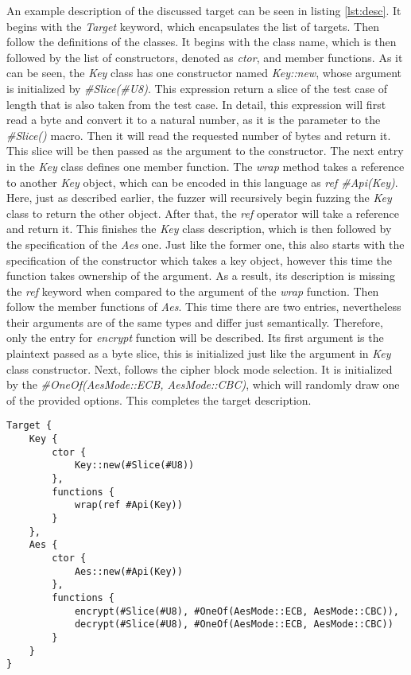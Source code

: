 An example description of the discussed target can be seen in listing \ref{lst:desc}. It begins with the \textit{Target} keyword, which encapsulates the list of targets. Then follow the definitions of the classes. It begins with the class name, which is then followed by the list of constructors, denoted as \textit{ctor}, and member functions. As it can be seen, the \textit{Key} class has one constructor named \textit{Key::new}, whose argument is initialized by \textit{\#Slice(\#U8)}. This expression return a slice of the test case of length that is also taken from the test case. In detail, this expression will first read a byte and convert it to a natural number, as it is the parameter to the \textit{\#Slice()} macro. Then it will read the requested number of bytes and return it. This slice will be then passed as the argument to the constructor. The next entry in the \textit{Key} class defines one member function. The \textit{wrap} method takes a reference to another \textit{Key} object, which can be encoded in this language as \textit{ref \#Api(Key)}. Here, just as described earlier, the fuzzer will recursively begin fuzzing the \textit{Key} class to return the other object. After that, the \textit{ref} operator will take a reference and return it. This finishes the \textit{Key} class description, which is then followed by the specification of the \textit{Aes} one. Just like the former one, this also starts with the specification of the constructor which takes a key object, however this time the function takes ownership of the argument. As a result, its description is missing the \textit{ref} keyword when compared to the argument of the \textit{wrap} function. Then follow the member functions of \textit{Aes}. This time there are two entries, nevertheless their arguments are of the same types and differ just semantically. Therefore, only the entry for \textit{encrypt} function will be described. Its first argument is the plaintext passed as a byte slice, this is initialized just like the argument in \textit{Key} class constructor. Next, follows the cipher block mode selection. It is initialized by the \textit{\#OneOf(AesMode::ECB, AesMode::CBC)}, which will randomly draw one of the provided options. This completes the target description.

\begin{lstlisting}[caption={API description in the created language}, label={lst:desc}]
Target {
    Key {
        ctor {
            Key::new(#Slice(#U8))
        },
        functions {
            wrap(ref #Api(Key))
        }
    },
    Aes {
        ctor {
            Aes::new(#Api(Key))
        },
        functions {
            encrypt(#Slice(#U8), #OneOf(AesMode::ECB, AesMode::CBC)),
            decrypt(#Slice(#U8), #OneOf(AesMode::ECB, AesMode::CBC))
        }
    }
}    
\end{lstlisting}

